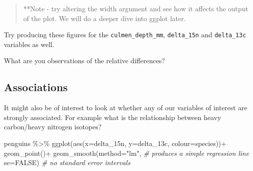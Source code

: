 \documentclass[
]{book}
\makeatletter
\newenvironment{Shaded}{\begin{snugshade}}{\end{snugshade}}
\newcommand{\AttributeTok}[1]{\textcolor[rgb]{0.77,0.63,0.00}{#1}}
\newcommand{\CommentTok}[1]{\textcolor[rgb]{0.56,0.35,0.01}{\textit{#1}}}
\newcommand{\ConstantTok}[1]{\textcolor[rgb]{0.00,0.00,0.00}{#1}}
\newcommand{\FunctionTok}[1]{\textcolor[rgb]{0.00,0.00,0.00}{#1}}
\newcommand{\NormalTok}[1]{#1}
\newcommand{\SpecialCharTok}[1]{\textcolor[rgb]{0.00,0.00,0.00}{#1}}
\newcommand{\StringTok}[1]{\textcolor[rgb]{0.31,0.60,0.02}{#1}}
\newenvironment{kframe}{%
\medskip{}
\setlength{\fboxsep}{.8em}
 \def\at@end@of@kframe{}%
 \ifinner\ifhmode%
  \def\at@end@of@kframe{\end{minipage}}%
  \begin{minipage}{\columnwidth}%
 \fi\fi%
 \def\FrameCommand##1{\hskip\@totalleftmargin \hskip-\fboxsep
 \colorbox{shadecolor}{##1}\hskip-\fboxsep
     \hskip-\linewidth \hskip-\@totalleftmargin \hskip\columnwidth}%
 \MakeFramed {\advance\hsize-\width
   \@totalleftmargin\z@ \linewidth\hsize
   \@setminipage}}%
 {\par\unskip\endMakeFramed%
 \at@end@of@kframe}
\newenvironment{block}[1]
  {
  \begin{itemize}
  \renewcommand{\labelitemi}{
    \raisebox{-.7\height}[0pt][0pt]{
      {\setkeys{Gin}{width=3em,keepaspectratio}\texttt{[image: images/\#1]}}
    }
  }
  \setlength{\fboxsep}{1em}
  \begin{kframe}
  \item
  }
  {
  \end{kframe}
  \end{itemize}
  }
\newenvironment{rmdquestion}
  {\begin{block}{question}}
  {\end{block}}
\makeatother
\begin{document}
\begin{quote}
**Note - try altering the width argument and see how it affects the output of the plot.
We will do a deeper dive into ggplot later.
\end{quote}

\begin{rmdquestion}
Try producing these figures for the \texttt{culmen\_depth\_mm},
\texttt{delta\_15n} and \texttt{delta\_13c} variables as well.

What are you observations of the relative differences?
\end{rmdquestion}

\hypertarget{associations}{%
\subsection{Associations}\label{associations}}

It might also be of interest to look at whether any of our variables of interest are strongly associated. For example what is the relationship between heavy carbon/heavy nitrogen isotopes?

\begin{Shaded}
\begin{Highlighting}[]
\NormalTok{penguins }\SpecialCharTok{\%\textgreater{}\%} 
    \FunctionTok{ggplot}\NormalTok{(}\FunctionTok{aes}\NormalTok{(}\AttributeTok{x=}\NormalTok{delta\_15n, }\AttributeTok{y=}\NormalTok{delta\_13c, }\AttributeTok{colour=}\NormalTok{species))}\SpecialCharTok{+}
    \FunctionTok{geom\_point}\NormalTok{()}\SpecialCharTok{+}
    \FunctionTok{geom\_smooth}\NormalTok{(}\AttributeTok{method=}\StringTok{"lm"}\NormalTok{, }\CommentTok{\# produces a simple regression line}
                \AttributeTok{se=}\ConstantTok{FALSE}\NormalTok{)    }\CommentTok{\# no standard error intervals}
\end{Highlighting}
\end{Shaded}
\end{document}
